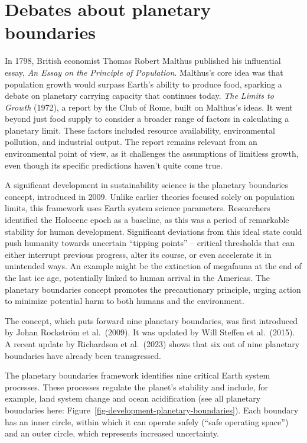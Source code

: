 \documentclass[
  a4paper,
  openany]{book}
\begin{document}
\section{Debates about planetary
boundaries}\label{debates-about-planetary-boundaries}

In 1798, British economist Thomas Robert Malthus published his
influential essay, \emph{An Essay on the Principle of Population}.
Malthus's core idea was that population growth would surpass Earth's
ability to produce food, sparking a debate on planetary carrying
capacity that continues today. \emph{The Limits to Growth} (1972), a
report by the Club of Rome, built on Malthus's ideas. It went beyond
just food supply to consider a broader range of factors in calculating a
planetary limit. These factors included resource availability,
environmental pollution, and industrial output. The report remains
relevant from an environmental point of view, as it challenges the
assumptions of limitless growth, even though its specific predictions
haven't quite come true.

A significant development in sustainability science is the planetary
boundaries concept, introduced in 2009. Unlike earlier theories focused
solely on population limits, this framework uses Earth system science
parameters. Researchers identified the Holocene epoch as a baseline, as
this was a period of remarkable stability for human development.
Significant deviations from this ideal state could push humanity towards
uncertain ``tipping points'' -- critical thresholds that can either
interrupt previous progress, alter its course, or even accelerate it in
unintended ways. An example might be the extinction of megafauna at the
end of the last ice age, potentially linked to human arrival in the
Americas. The planetary boundaries concept promotes the precautionary
principle, urging action to minimize potential harm to both humans and
the environment.

The concept, which puts forward nine planetary boundaries, was first
introduced by Johan Rockström et al.~(2009). It was updated by Will
Steffen et al.~(2015). A recent update by Richardson et al.~(2023) shows
that six out of nine planetary boundaries have already been
transgressed.

The planetary boundaries framework identifies nine critical Earth system
processes. These processes regulate the planet's stability and include,
for example, land system change and ocean acidification (see all
planetary boundaries here:
Figure~\ref{fig-development-planetary-boundaries}). Each boundary has an
inner circle, within which it can operate safely (``safe operating
space'') and an outer circle, which represents increased uncertainty.
\end{document}
